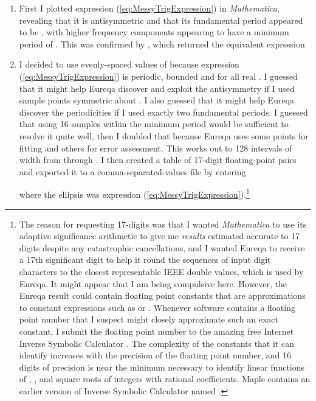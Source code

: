 \documentclass[12pt,english]{article}
\begin{document}
\begin{enumerate}
\item First I plotted expression (\ref{eq:MessyTrigExpression}) in \textsl{Mathematica},
revealing that it is antisymmetric and that its fundamental period
appeared to be , with higher frequency components appearing
to have a minimum period of . This was confirmed by ,
which returned the equivalent expression\vspace{-5pt}

\vspace{-5pt}

\item I decided to use evenly-spaced values of  because expression (\ref{eq:MessyTrigExpression})
is periodic, bounded and  for all real . I guessed
that it might help Eureqa discover and exploit the antisymmetry if
I used sample points symmetric about . I also guessed that it
might help Eureqa discover the periodicities if I used exactly two
fundamental periods. I guessed that using 16 samples within the minimum
period  would be sufficient to resolve it quite well, then
I doubled that because Eureqa uses some points for fitting and others
for error assessment. This works out to 128 intervals of width 
from  through . I then created a table of 17-digit 
 floating-point pairs and exported it to a comma-separated-values
file by entering\vspace{-5pt}

where the ellipsis was expression (\ref{eq:MessyTrigExpression}).\footnote{The reason for requesting 17-digits was that I wanted \textsl{Mathematica}
to use its adaptive significance arithmetic to give me \textsl{results}
estimated accurate to 17 digits despite any catastrophic cancellations,
and I wanted Eureqa to receive a 17th significant digit to help it
round the sequences of input digit characters to the closest representable
IEEE double values, which is used by Eureqa. It might appear that
I am being compulsive here. However, the Eureqa result could contain
floating point constants that are approximations to constant expressions
such as  or . Whenever software contains a floating
point number that I suspect might closely approximate such an exact
constant, I submit the floating point number to the amazing free Internet
Inverse Symbolic Calculator \cite{InverseSymbolicCalculator-1}. The
complexity of the constants that it can identify increases with the
precision of the floating point number, and 16 digits of precision
is near the minimum necessary to identify linear functions of ,
, and square roots of integers with rational coefficients. Maple
contains an earlier version of Inverse Symbolic Calculator named .

}
\end{enumerate}
\end{document}
